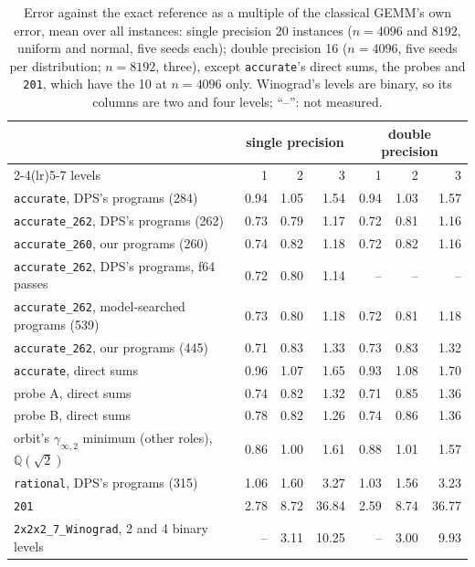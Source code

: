 \begin{table}[t]
\centering
\caption{Error against the exact reference as a multiple of the classical GEMM's own error, mean over all instances: single precision 20 instances ($n=4096$ and $8192$, uniform and normal, five seeds each); double precision 16 ($n=4096$, five seeds per distribution; $n=8192$, three), except \texttt{accurate}'s direct sums, the probes and \texttt{201}, which have the 10 at $n=4096$ only.  Winograd's levels are binary, so its columns are two and four levels; ``--'': not measured.}
\label{tab:acc}
\small
\begin{tabular}{lrrrrrr}
\toprule
 & \multicolumn{3}{c}{single precision} & \multicolumn{3}{c}{double precision}\\
\cmidrule(lr){2-4}\cmidrule(lr){5-7}
levels & 1 & 2 & 3 & 1 & 2 & 3\\
\midrule
\texttt{accurate}, DPS's programs (284) & 0.94 & 1.05 & 1.54 & 0.94 & 1.03 & 1.57\\
\texttt{accurate\_262}, DPS's programs (262) & 0.73 & 0.79 & 1.17 & 0.72 & 0.81 & 1.16\\
\texttt{accurate\_260}, our programs (260) & 0.74 & 0.82 & 1.18 & 0.72 & 0.82 & 1.16\\
\texttt{accurate\_262}, DPS's programs, f64 passes & 0.72 & 0.80 & 1.14 & -- & -- & --\\
\texttt{accurate\_262}, model-searched programs (539) & 0.73 & 0.80 & 1.18 & 0.72 & 0.81 & 1.18\\
\texttt{accurate\_262}, our programs (445) & 0.71 & 0.83 & 1.33 & 0.73 & 0.83 & 1.32\\
\texttt{accurate}, direct sums & 0.96 & 1.07 & 1.65 & 0.93 & 1.08 & 1.70\\
probe A, direct sums & 0.74 & 0.82 & 1.32 & 0.71 & 0.85 & 1.36\\
probe B, direct sums & 0.78 & 0.82 & 1.26 & 0.74 & 0.86 & 1.36\\
orbit's $\gamma_{\infty,2}$ minimum (other roles), $\mathbb{Q}(\sqrt2)$ & 0.86 & 1.00 & 1.61 & 0.88 & 1.01 & 1.57\\
\texttt{rational}, DPS's programs (315) & 1.06 & 1.60 & 3.27 & 1.03 & 1.56 & 3.23\\
\texttt{201} & 2.78 & 8.72 & 36.84 & 2.59 & 8.74 & 36.77\\
\midrule
\texttt{2x2x2\_7\_Winograd}, 2 and 4 binary levels & -- & 3.11 & 10.25 & -- & 3.00 & 9.93\\
\bottomrule
\end{tabular}
\end{table}

